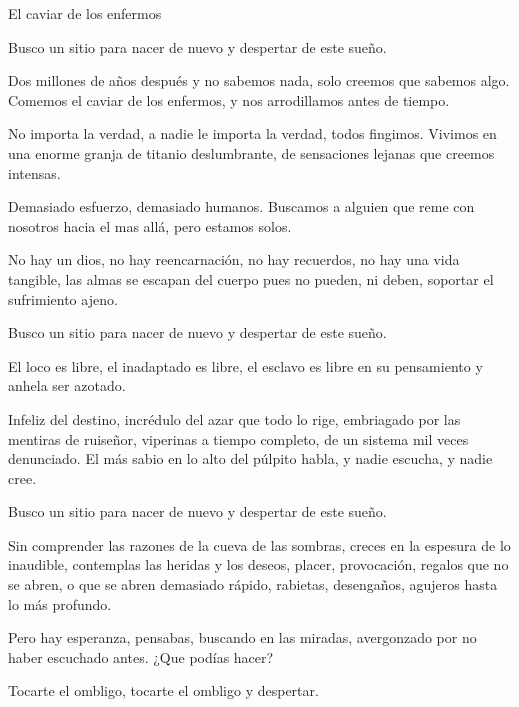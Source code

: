 El caviar de los enfermos 

Busco un sitio para nacer de nuevo
y despertar de este sueño.

Dos millones de años después y no sabemos nada,
solo creemos que sabemos algo.
Comemos el caviar de los enfermos,
y nos arrodillamos antes de tiempo.

No importa la verdad,
a nadie le importa la verdad,
todos fingimos.
Vivimos en una enorme granja
de titanio deslumbrante,
de sensaciones lejanas que creemos intensas.

Demasiado esfuerzo,
demasiado humanos.
Buscamos a alguien que reme con nosotros hacia el mas allá,
pero estamos solos.

No hay un dios,
no hay reencarnación,
no hay recuerdos,
no hay una vida tangible,
las almas se escapan del cuerpo pues
no pueden, 
ni deben,
soportar el sufrimiento ajeno.

Busco un sitio para nacer de nuevo
y despertar de este sueño.

El loco es libre,
el inadaptado es libre,
el esclavo es libre en su pensamiento
y anhela ser azotado.

Infeliz del destino,
incrédulo del azar que todo lo rige,
embriagado por las mentiras de ruiseñor,
viperinas a tiempo completo,
de un sistema mil veces denunciado.
El más sabio en lo alto del púlpito habla,
y nadie escucha,
y nadie cree.

Busco un sitio para nacer de nuevo
y despertar de este sueño.


Sin comprender las razones de la cueva de las sombras,
creces en la espesura de lo inaudible,
contemplas las heridas y los deseos,
placer, provocación, regalos que no se abren,
o que se abren demasiado rápido,
rabietas, desengaños, agujeros hasta lo más profundo.

Pero hay esperanza, pensabas,
buscando en las miradas,
avergonzado por no haber escuchado antes.
¿Que podías hacer?

Tocarte el ombligo,
tocarte el ombligo y despertar.